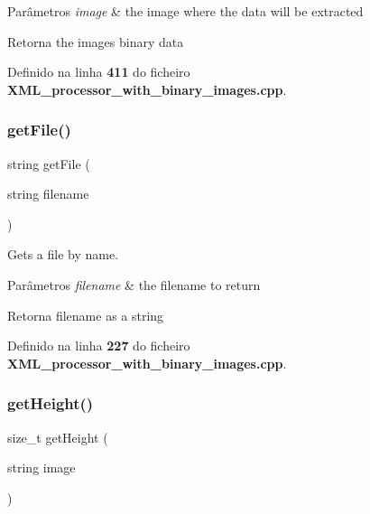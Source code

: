 \begin{DoxyParams}{Parâmetros}
{\em image} & the image where the data will be extracted \\
\hline
\end{DoxyParams}
\begin{DoxyReturn}{Retorna}
the image\textquotesingle{}s binary data 
\end{DoxyReturn}


Definido na linha \textbf{ 411} do ficheiro \textbf{ X\+M\+L\+\_\+processor\+\_\+with\+\_\+binary\+\_\+images.\+cpp}.

\mbox{\label{_x_m_l__processor__with__binary__images_8cpp_aa6a461ba9610542965f22f062b5a1bb3}} 
\subsubsection{get\+File()}
{\footnotesize\ttfamily string get\+File (\begin{DoxyParamCaption}\item[{string}]{filename }\end{DoxyParamCaption})}



Gets a file by name. 


\begin{DoxyParams}{Parâmetros}
{\em filename} & the filename to return \\
\hline
\end{DoxyParams}
\begin{DoxyReturn}{Retorna}
filename as a string 
\end{DoxyReturn}


Definido na linha \textbf{ 227} do ficheiro \textbf{ X\+M\+L\+\_\+processor\+\_\+with\+\_\+binary\+\_\+images.\+cpp}.

\mbox{\label{_x_m_l__processor__with__binary__images_8cpp_aed973101a10d973ff66c0c53dbe3237f}} 
\subsubsection{get\+Height()}
{\footnotesize\ttfamily size\+\_\+t get\+Height (\begin{DoxyParamCaption}\item[{string}]{image }\end{DoxyParamCaption})}



